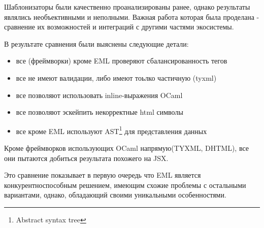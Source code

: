 Шаблонизаторы были качественно проанализированы ранее, однако результаты являлись необъективными и неполными. Важная работа которая была проделана - сравнение их возможностей и интеграций с другими частями экосистемы.

В результате сравнения были выяснены следующие детали:
\begin{itemize}
    \item все (фреймворки) кроме EML проверяют сбалансированность тегов
    \item все не имеют валидации, либо имеют тоьлко частичную (tyxml) %
    \item все позволяют использовать inline-выражения OCaml
    \item все позволяют эскейпить некорректные html символы %
    \item все кроме EML используют AST\footnote{Abstract syntax tree} для представления данных
\end{itemize}

Кроме фреймворков использующих OCaml напрямую(TYXML, DHTML), все они пытаются добиться результата похожего на JSX.

Это сравнение показывает в первую очередь что EML является конкурентноспособным решением, имеющим схожие проблемы с остальными вариантами, однако, обладающий своими уникальными особенностями.








